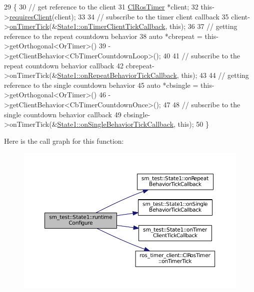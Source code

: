\begin{DoxyCode}
29     \{
30         \textcolor{comment}{// get reference to the client}
31         \hyperlink{classros__timer__client_1_1ClRosTimer}{ClRosTimer} *client;
32         this->\hyperlink{classsmacc_1_1ISmaccState_a7f95c9f0a6ea2d6f18d1aec0519de4ac}{requiresClient}(client);
33 
34         \textcolor{comment}{// subscribe to the timer client callback}
35         client->\hyperlink{classros__timer__client_1_1ClRosTimer_a06ecf6427b5df59f29879ab3bd1f120c}{onTimerTick}(&\hyperlink{structsm__test_1_1State1_ae4a890c0c2644510cefdc7087df3f2b3}{State1::onTimerClientTickCallback},
       \textcolor{keyword}{this});
36 
37         \textcolor{comment}{// getting reference to the repeat countdown behavior}
38         \textcolor{keyword}{auto} *cbrepeat = this->getOrthogonal<OrTimer>()
39                              ->getClientBehavior<CbTimerCountdownLoop>();
40 
41         \textcolor{comment}{// subscribe to the repeat countdown behavior callback}
42         cbrepeat->onTimerTick(&\hyperlink{structsm__test_1_1State1_ae05b64978977a2cb12219caa2c2626fb}{State1::onRepeatBehaviorTickCallback}, \textcolor{keyword}{
      this});
43 
44         \textcolor{comment}{// getting reference to the single countdown behavior}
45         \textcolor{keyword}{auto} *cbsingle = this->getOrthogonal<OrTimer>()
46                              ->getClientBehavior<CbTimerCountdownOnce>();
47 
48         \textcolor{comment}{// subscribe to the single countdown behavior callback}
49         cbsingle->onTimerTick(&\hyperlink{structsm__test_1_1State1_a54da744e6cff37d85b2dd9bff49a6005}{State1::onSingleBehaviorTickCallback}, \textcolor{keyword}{
      this});
50     \}
\end{DoxyCode}


Here is the call graph for this function\+:
\nopagebreak
\begin{figure}[H]
\begin{center}
\leavevmode
\includegraphics[width=350pt]{structsm__test_1_1State1_aa83e2eb5a7e9a479c5f246b63b473d33_cgraph}
\end{center}
\end{figure}


